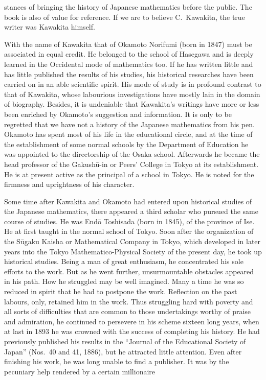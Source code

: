 \documentclass[11pt]{article}
\newcommand{\scanpage}[2]{\clearpage\setcounter{footnote}{0}\noindent{\footnotesize\color{gray}PDF page #1 · #2}\par\medskip}
\begin{document}
\scanpage{0341}{printed page 327}
\noindent stances of bringing the history of Japanese mathematics before the public. The book is also of value for reference. If we are to believe C.~Kawakita, the true writer was Kawakita himself.

With the name of Kawakita that of Okamoto Norifumi (born in 1847) must be associated in equal credit. He belonged to the school of Hasegawa and is deeply learned in the Occidental mode of mathematics too. If he has written little and has little published the results of his studies, his historical researches have been carried on in an able scientific spirit. His mode of study is in profound contrast to that of Kawakita, whose labourious investigations have mostly lain in the domain of biography. Besides, it is undeniable that Kawakita's writings have more or less been enriched by Okamoto's suggestion and information. It is only to be regretted that we have not a history of the Japanese mathematics from his pen. Okamoto has spent most of his life in the educational circle, and at the time of the establishment of some normal schools by the Department of Education he was appointed to the directorship of the Osaka school. Afterwards he became the head professor of the Gakushū-in or Peers' College in Tokyo at its establishment. He is at present active as the principal of a school in Tokyo. He is noted for the firmness and uprightness of his character.

Some time after Kawakita and Okamoto had entered upon historical studies of the Japanese mathematics, there appeared a third scholar who pursued the same course of studies. He was Endō Toshisada (born in 1845), of the province of Ise. He at first taught in the normal school of Tokyo. Soon after the organization of the Sūgaku Kaisha or Mathematical Company in Tokyo, which developed in later years into the Tokyo Mathematico-Physical Society of the present day, he took up historical studies. Being a man of great enthusiasm, he concentrated his sole efforts to the work. But as he went further, unsurmountable obstacles appeared in his path. How he struggled may be well imagined. Many a time he was so reduced in spirit that he had to postpone the work. Reflection on the past labours, only, retained him in the work. Thus struggling hard with poverty and all sorts of difficulties that are common to those undertakings worthy of praise and admiration, he continued to persevere in his scheme sixteen long years, when at last in 1893 he was crowned with the success of completing his history. He had previously published his results in the ``Journal of the Educational Society of Japan'' (Nos.~40 and 41, 1886), but he attracted little attention. Even after finishing his work, he was long unable to find a publisher. It was by the pecuniary help rendered by a certain millionaire
\end{document}
